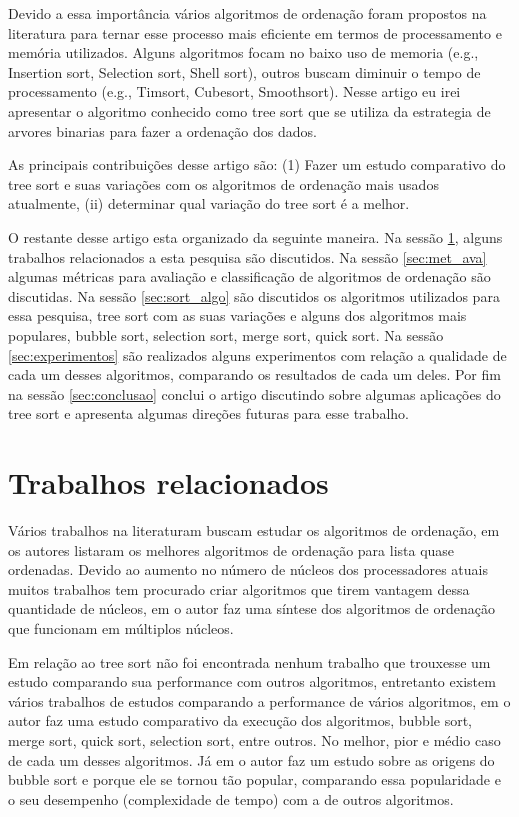 \documentclass[12pt]{article}
\begin{document}
Devido a essa importância vários algoritmos de ordenação foram propostos na literatura para ternar esse processo mais eficiente em termos de processamento e memória utilizados. Alguns algoritmos focam no baixo uso de memoria \cite{yadav2016sorting} (e.g., Insertion sort, Selection sort, Shell sort), outros buscam diminuir o tempo de processamento (e.g., Timsort, Cubesort, Smoothsort). Nesse artigo eu irei apresentar o algoritmo conhecido como tree sort que se utiliza da estrategia de arvores binarias para fazer a ordenação dos dados.

As principais contribuições desse artigo são: (1) Fazer um estudo comparativo do tree sort e suas variações com os algoritmos de ordenação mais usados atualmente, (ii) determinar qual variação do tree sort é a melhor.

O restante desse artigo esta organizado da seguinte maneira. Na sessão \ref{sec:trab_rel}, alguns trabalhos relacionados a esta pesquisa são discutidos. Na sessão \ref{sec:met_ava} algumas métricas para avaliação e classificação de algoritmos de ordenação são discutidas. Na sessão \ref{sec:sort_algo} são discutidos os algoritmos utilizados para essa pesquisa, tree sort com as suas variações e alguns dos algoritmos mais populares, bubble sort, selection sort, merge sort, quick sort. Na sessão \ref{sec:experimentos} são realizados alguns experimentos com relação a qualidade de cada um desses algoritmos, comparando os resultados de cada um deles. Por fim na sessão \ref{sec:conclusao} conclui o artigo discutindo sobre algumas aplicações do tree sort e apresenta algumas direções futuras para esse trabalho.

\section{Trabalhos relacionados}
\label{sec:trab_rel}

Vários trabalhos na literaturam buscam estudar os algoritmos de ordenação, em \cite{cook1980best} os autores listaram os melhores algoritmos de ordenação para lista quase ordenadas. Devido ao aumento no número de núcleos dos processadores atuais muitos trabalhos tem procurado criar algoritmos que tirem vantagem dessa quantidade de núcleos, em \cite{akl2014parallel} o autor faz uma síntese dos algoritmos de ordenação que funcionam em múltiplos núcleos. 

Em relação ao tree sort não foi encontrada nenhum trabalho que trouxesse um estudo comparando sua performance com outros algoritmos, entretanto existem vários trabalhos de estudos comparando a performance de vários algoritmos, em \cite{khancomparative} o autor faz uma estudo comparativo da execução dos algoritmos, bubble sort, merge sort, quick sort, selection sort, entre outros. No melhor, pior e médio caso de cada um desses algoritmos. Já em \cite{astrachan2003bubble} o autor faz um estudo sobre as origens do bubble sort e porque ele se tornou tão popular, comparando essa popularidade e o seu desempenho (complexidade de tempo) com a de outros algoritmos.
\end{document}
